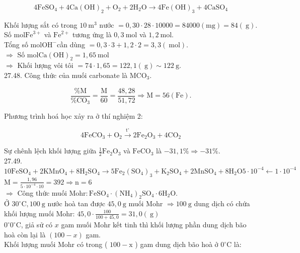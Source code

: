 \documentclass[10pt]{article}
\begin{document}
\begin{equation*}
4 \mathrm{FeSO}_{4}+4 \mathrm{Ca}(\mathrm{OH})_{2}+\mathrm{O}_{2}+2 \mathrm{H}_{2} \mathrm{O} \longrightarrow 4 \mathrm{Fe}(\mathrm{OH})_{3}+4 \mathrm{CaSO}_{4} \tag{1}
\end{equation*}


Khối lượng sắt có trong $10 \mathrm{~m}^{3}$ nước $=0,30 \cdot 28 \cdot 10000=84000(\mathrm{mg})=84(\mathrm{~g})$.\\
Số $\mathrm{mol} \mathrm{Fe}^{3+}$ và $\mathrm{Fe}^{2+}$ tương ứng là $0,3 \mathrm{~mol}$ và $1,2 \mathrm{~mol}$.\\
Tổng số $\mathrm{mol} \mathrm{OH}^{-}$cần dùng $=0,3 \cdot 3+1,2 \cdot 2=3,3(\mathrm{~mol})$.\\
$\Rightarrow$ Số $\mathrm{mol} \mathrm{Ca}(\mathrm{OH})_{2}=1,65 \mathrm{~mol}$\\
$\Rightarrow$ Khối lượng vôi tôi $=74 \cdot 1,65=122,1(\mathrm{~g}) \sim 122 \mathrm{~g}$.\\
27.48. Công thức của muối carbonate là $\mathrm{MCO}_{3}$.

$$
\frac{\% \mathrm{M}}{\% \mathrm{CO}_{3}}=\frac{\mathrm{M}}{60}=\frac{48,28}{51,72} \Rightarrow \mathrm{M}=56(\mathrm{Fe}) .
$$

Phương trình hoá học xảy ra ở thí nghiệm 2:

$$
4 \mathrm{FeCO}_{3}+\mathrm{O}_{2} \xrightarrow{\mathrm{t}^{\circ}} 2 \mathrm{Fe}_{2} \mathrm{O}_{3}+4 \mathrm{CO}_{2}
$$

Sự chênh lệch khối lượng giữa $\frac{1}{2} \mathrm{Fe}_{2} \mathrm{O}_{3}$ và $\mathrm{FeCO}_{3}$ là $-31,1 \% \Rightarrow-31 \%$.\\
27.49.\\
$10 \mathrm{FeSO}_{4}+2 \mathrm{KMnO}_{4}+8 \mathrm{H}_{2} \mathrm{SO}_{4} \longrightarrow 5 \mathrm{Fe}_{2}\left(\mathrm{SO}_{4}\right)_{3}+\mathrm{K}_{2} \mathrm{SO}_{4}+2 \mathrm{MnSO}_{4}+8 \mathrm{H}_{2} \mathrm{O} 5 \cdot 10^{-4} \leftarrow 1 \cdot 10^{-4}$\\
$\mathrm{M}=\frac{1,96}{5 \cdot 10^{-4} \cdot 10}=392 \Rightarrow \mathrm{n}=6$\\
$\Rightarrow$ Công thức muối $\mathrm{Mohr}: \mathrm{FeSO}_{4} \cdot\left(\mathrm{NH}_{4}\right)_{2} \mathrm{SO}_{4} \cdot 6 \mathrm{H}_{2} \mathrm{O}$.\\
Ở $30^{\circ} \mathrm{C}, 100 \mathrm{~g}$ nước hoà tan được $45,0 \mathrm{~g}$ muối Mohr $\Rightarrow 100 \mathrm{~g}$ dung dịch có chứa khối lượng muối Mohr: $45,0 \cdot \frac{100}{100+45,0}=31,0(\mathrm{~g})$\\
$0^{\circ} 0^{\circ} \mathrm{C}$, giả sử có $x$ gam muối Mohr kết tinh thì khối lượng phần dung dịch bão hoà còn lại là $(100-x)$ gam.\\
Khối lượng muối Mohr có trong ( $100-\mathrm{x}$ ) gam dung dịch bão hoà ở $0^{\circ} \mathrm{C}$ là:
\end{document}
